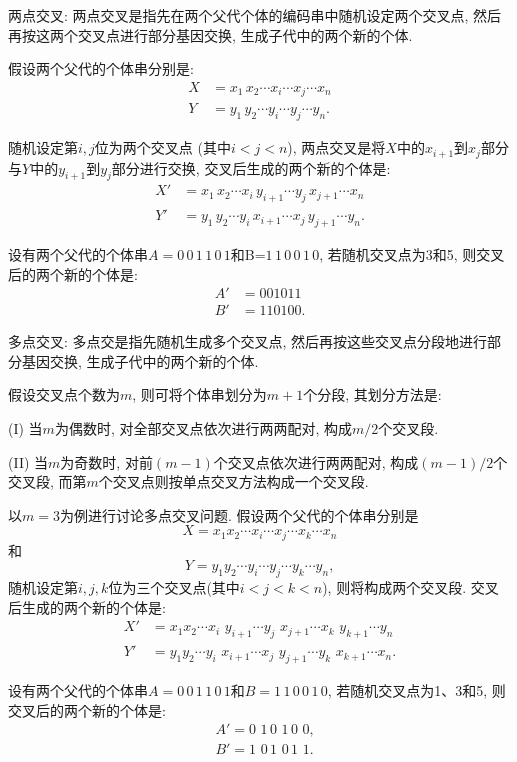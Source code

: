     两点交叉: 两点交叉是指先在两个父代个体的编码串中随机设定两个交叉点, 然后再按这两个交叉点进行部分基因交换, 生成子代中的两个新的个体.

\begin{example}
假设两个父代的个体串分别是:
\begin{align*}
    X&=x_1\, x_2 \cdots x_i \cdots x_j \cdots x_n\\
    Y&=y_1\, y_2 \cdots y_i \cdots y_j \cdots y_n.
\end{align*}

随机设定第$i,j$位为两个交叉点 (其中$i<j<n$), 两点交叉是将$X$中的$x_{i+1}$到$x_j$部分与$Y$中的$y_{i+1}$到$y_j$部分进行交换, 交叉后生成的两个新的个体是:
\begin{align*}
    X'&= x_1\, x_2 \cdots x_i\, y_{i+1} \cdots y_j\, x_{j+1} \cdots x_n\\
    Y'&= y_1\, y_2  \cdots y_i\, x_{i+1} \cdots x_j\, y_{j+1} \cdots y_n.
\end{align*}

设有两个父代的个体串$A= 0\, 0\,  1\,  1\,  0\,  1$和B=$1\,  1\,  0\,  0\,  1\,  0$, 若随机交叉点为3和5, 则交叉后的两个新的个体是:
\begin{align*}
     A'&= 0 0 1 0 1 1\\
    B'&= 1 1 0 1 0 0.
\end{align*}
\vspace{-0.5cm}
\end{example}

     多点交叉: 多点交是指先随机生成多个交叉点, 然后再按这些交叉点分段地进行部分基因交换, 生成子代中的两个新的个体.

假设交叉点个数为$m$, 则可将个体串划分为$m+1$个分段, 其划分方法是:

\qquad (I) 当$m$为偶数时, 对全部交叉点依次进行两两配对, 构成$m/2$个交叉段.

\qquad (II) 当$m$为奇数时, 对前$(m-1)$个交叉点依次进行两两配对, 构成$(m-1)/2$个交叉段, 而第$m$个交叉点则按单点交叉方法构成一个交叉段.

\begin{example}
以$m=3$为例进行讨论多点交叉问题. 假设两个父代的个体串分别是$$X=x_1 x_2 \cdots x_i \cdots x_j \cdots x_k \cdots x_n$$和$$Y=y_1 y_2 \cdots y_i \cdots y_j \cdots y_k \cdots y_n,$$
随机设定第$i,j,k$位为三个交叉点(其中$i<j<k<n$), 则将构成两个交叉段. 交叉后生成的两个新的个体是:
\begin{align*}
  X'&= x_1 x_2 \cdots x_i  \,\,y_{i+1} \cdots y_j \,\,x_{j+1} \cdots x_k \,\,y_{k+1} \cdots y_n\\
  Y'&= y_1 y_2 \cdots y_i\,\, x_{i+1} \cdots x_j\,\, y_{j+1} \cdots y_k \,\,x_{k+1} \cdots x_n.
\end{align*}

设有两个父代的个体串$A= 0\, 0\, 1\, 1\, 0\, 1$和$B= 1\, 1\, 0\, 0\, 1\, 0$, 若随机交叉点为1、3和5, 则交叉后的两个新的个体是:
\begin{align*}
    &A'= 0\,\, 1\, 0\,\, 1\, 0\,\, 0,\\
    &B'= 1\,\, 0\, 1\,\, 0\, 1\,\, 1.
\end{align*}
\vspace{-0.4cm}
\end{example}


